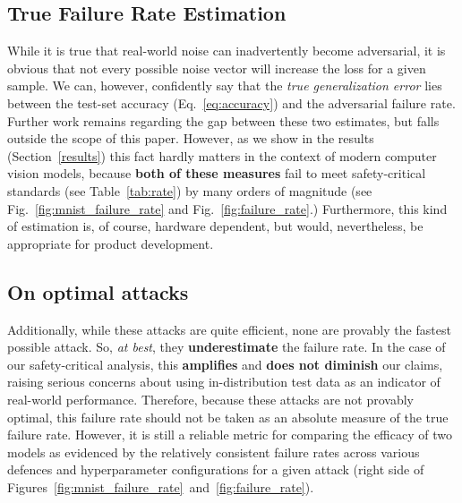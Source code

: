 \documentclass[journal]{IEEEtran}
\begin{document}
\subsection{True Failure Rate Estimation}
While it is true that real-world noise can inadvertently become adversarial, it is obvious that not every possible noise vector will increase the loss for a given sample.
We can, however, confidently say that the \textit{true generalization error} lies between the test-set accuracy (Eq.~\ref{eq:accuracy}) and the adversarial failure rate.
Further work remains regarding the gap between these two estimates, but falls outside the scope of this paper.
However, as we show in the results (Section~\ref{results}) this fact hardly matters in the context of modern computer vision models, because \textbf{both of these measures} fail to meet safety-critical standards (see Table~\ref{tab:rate}) by many orders of magnitude (see Fig.~\ref{fig:mnist_failure_rate} and Fig.~\ref{fig:failure_rate}.)
Furthermore, this kind of estimation is, of course, hardware dependent, but would,  nevertheless, be appropriate for product development.

\subsection{On optimal attacks}
Additionally, while these attacks are quite efficient, none are provably the fastest possible attack.
So, \textit{at best}, they \textbf{underestimate} the failure rate.
In the case of our safety-critical analysis, this \textbf{amplifies} and \textbf{does not diminish} our claims, raising serious concerns about using in-distribution test data as an indicator of real-world performance.
Therefore, because these attacks are not provably optimal, this failure rate should not be taken as an absolute measure of the true failure rate.
However, it is still a reliable metric for comparing the efficacy of two models as evidenced by the relatively consistent failure rates across various defences and hyperparameter configurations for a given attack (right side of Figures~\ref{fig:mnist_failure_rate}~and~\ref{fig:failure_rate}).
\end{document}
